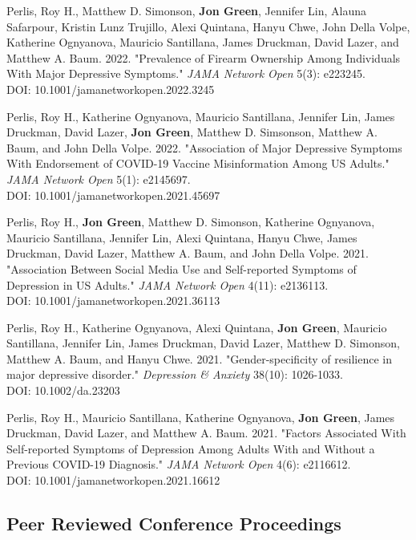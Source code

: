 \documentclass[letterpaper]{article}
\begin{document}
\begin{etaremune}
\item  Perlis, Roy H., Matthew D. Simonson, \textbf{Jon Green}, Jennifer Lin, Alauna Safarpour, Kristin Lunz Trujillo, Alexi Quintana, Hanyu Chwe, John Della Volpe, Katherine Ognyanova, Mauricio Santillana,  James Druckman, David Lazer, and Matthew A. Baum. 2022. "Prevalence of Firearm Ownership Among Individuals With Major Depressive Symptoms." \textit{JAMA Network Open} 5(3): e223245. \\
DOI: 10.1001/jamanetworkopen.2022.3245

\item  Perlis, Roy H., Katherine Ognyanova, Mauricio Santillana, Jennifer Lin, James Druckman, David Lazer,  \textbf{Jon Green}, Matthew D. Simsonson, Matthew A. Baum, and John Della Volpe. 2022. "Association of Major Depressive Symptoms With Endorsement of COVID-19 Vaccine Misinformation Among US Adults." \textit{JAMA Network Open} 5(1): e2145697. \\
DOI: 10.1001/jamanetworkopen.2021.45697

\item  Perlis, Roy H., \textbf{Jon Green}, Matthew D. Simonson, Katherine Ognyanova, Mauricio Santillana, Jennifer Lin, Alexi Quintana, Hanyu Chwe, James Druckman, David Lazer, Matthew A. Baum, and John Della Volpe. 2021. "Association Between Social Media Use and Self-reported Symptoms of Depression in US Adults." \textit{JAMA Network Open} 4(11): e2136113. \\
DOI: 10.1001/jamanetworkopen.2021.36113

\item  Perlis, Roy H., Katherine Ognyanova, Alexi Quintana, \textbf{Jon Green}, Mauricio Santillana, Jennifer Lin, James Druckman, David Lazer, Matthew D. Simonson, Matthew A. Baum, and Hanyu Chwe. 2021. "Gender-specificity of resilience in major depressive disorder." \textit{Depression \& Anxiety} 38(10): 1026-1033. \\
DOI: 10.1002/da.23203

\item  Perlis, Roy H., Mauricio Santillana, Katherine Ognyanova, \textbf{Jon Green}, James Druckman, David Lazer, and Matthew A. Baum. 2021. "Factors Associated With Self-reported Symptoms of Depression Among Adults With and Without a Previous COVID-19 Diagnosis." \textit{JAMA Network Open} 4(6): e2116612. \\
DOI: 10.1001/jamanetworkopen.2021.16612
\end{etaremune}

\subsection*{Peer Reviewed Conference Proceedings}
\end{document}
